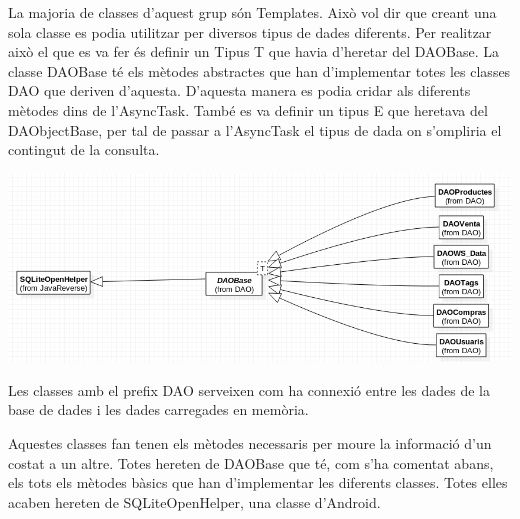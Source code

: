 \documentclass{article}[]
\begin{document}
La majoria de classes d'aquest grup són Templates. Això vol dir que creant una sola classe es podia utilitzar per diversos tipus de dades diferents. Per realitzar això el que es va fer és definir un Tipus T que havia d'heretar del DAOBase. La classe DAOBase té els mètodes abstractes que han d'implementar totes les classes DAO que deriven d'aquesta. D'aquesta manera es podia cridar als diferents mètodes dins de l'AsyncTask. També es va definir un tipus E que heretava del DAObjectBase, per tal de passar a l'AsyncTask el tipus de dada on s'ompliria el contingut de la consulta.
	\begin{center}
	\includegraphics[scale=0.5]{img/6.png}
	\end{center}
Les classes amb el prefix DAO serveixen com ha connexió entre les dades de la base de dades i les dades carregades en memòria.

Aquestes classes fan tenen els mètodes necessaris per moure la informació d'un costat a un altre. Totes hereten de DAOBase que té, com s'ha comentat abans, els tots els mètodes bàsics que han d'implementar les diferents classes. Totes elles acaben hereten de SQLiteOpenHelper, una classe d'Android.
\end{document}
